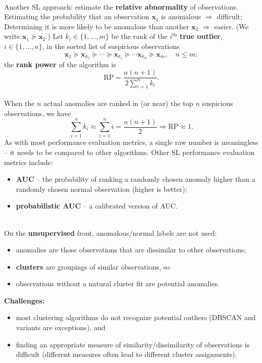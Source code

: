 \documentclass[20pt,landscape,footrule,headrule]{foils}
\newcommand{\newl}{\newline\newline}
\begin{document}
\newpage \ \\ \noindent Another SL approach: estimate the \textbf{relative abnormality} of observations. 
\newl 
Estimating the probability that an observation $\mathbf{x}_1$ is anomalous $\Longrightarrow$ difficult; \\ 
Determining it is more likely to be anomalous than another $\mathbf{x}_2$ $\Longrightarrow$ easier. (We write $\mathbf{x}_1\succeq \mathbf{x}_2$.) \newl Let $k_i\in\{1,\ldots,m\}$ be the rank of the $i^{\text{th}}$ \textbf{true outlier}, $i\in \{1,\ldots,n\}$, in the sorted list of suspicious observations $$\mathbf{x}_1\succeq \mathbf{x}_{k_1}\succeq \cdots\succeq\mathbf{x}_{k_i}\succeq \cdots \mathbf{x}_{k_n}\succeq \mathbf{x}_m,\quad n\leq m;$$ the \textbf{rank power} of the algorithm is $$\text{RP}=\frac{n(n+1)}{2\sum_{i=1}^nk_i}.$$ \newpage\ \\ \noindent When the $n$ actual anomalies are ranked in (or near) the top $n$ suspicious observations, we have $$\sum_{i=1}^nk_i\approx \sum_{i=1}^ni =\frac{n(n+1)}{2} \Longrightarrow \text{RP}\approx 1.$$ As with most performance evaluation metrics, a single raw number is meaningless -- it needs to be compared to other algorithms. \newl Other SL performance evaluation metrics include: 
\begin{itemize}
\item \textbf{AUC} --  the probability of ranking a randomly chosen anomaly higher than a randomly chosen normal observation (higher is better);
\item \textbf{probabilistic AUC} -- a calibrated version of AUC. 
\end{itemize}\newpage \ \\ \noindent On the \textbf{unsupervised} front,  anomalous/normal labels are not used:
\begin{itemize}
\item anomalies are those observations that are dissimilar to other observations;
\item \textbf{clusters} are groupings of similar observations, so 
\item observations without a natural cluster fit are potential anomalies. 
\end{itemize}
\textbf{Challenges:} 
\begin{itemize}
\item most clustering algorithms do not recognize potential outliers (DBSCAN and variants are exceptions), and 
\item finding an appropriate measure of similarity/dissimilarity of observations is difficult (different measures often lead to different cluster assignments).  \end{itemize}
\end{document}
